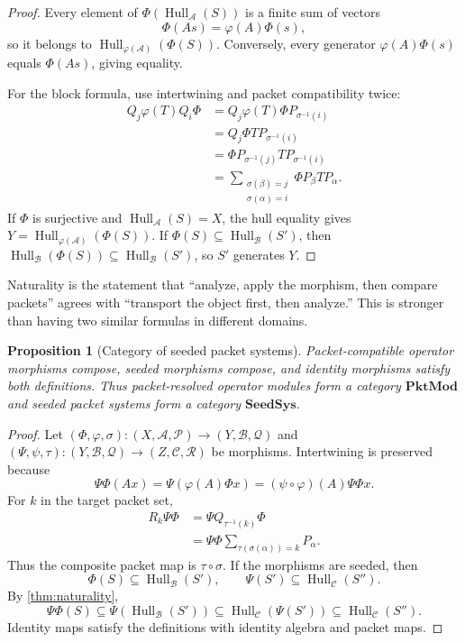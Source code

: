 \documentclass[11pt]{article}
\newtheorem{proposition}[proposition]{Proposition}
\theoremstyle{definition}
\theoremstyle{remark}
\theoremstyle{definition}\newtheorem{example}[theorem]{Example}
\newcommand{\A}{\mathcal A}
\newcommand{\B}{\mathcal B}
\newcommand{\Ccal}{\mathcal C}
\newcommand{\Pcal}{\mathcal P}
\newcommand{\Qcal}{\mathcal Q}
\newcommand{\Rcal}{\mathcal R}
\newcommand{\Hull}{\operatorname{Hull}}
\newcommand{\RecordID}[1]{\label{record:#1}}
\newcommand{\Depends}[1]{}
\begin{document}
\begin{proof}
Every element of $\Phi(\Hull_\A(S))$ is a finite sum of vectors
\[
\Phi(As)=\varphi(A)\Phi(s),
\]
so it belongs to $\Hull_{\varphi(\A)}(\Phi(S))$.  Conversely, every generator $\varphi(A)\Phi(s)$ equals $\Phi(As)$, giving equality.

For the block formula, use intertwining and packet compatibility twice:
\begin{align*}
Q_j\varphi(T)Q_i\Phi
&=Q_j\varphi(T)\Phi P_{\sigma^{-1}(i)}\\
&=Q_j\Phi TP_{\sigma^{-1}(i)}\\
&=\Phi P_{\sigma^{-1}(j)}TP_{\sigma^{-1}(i)}\\
&=\sum_{\substack{\sigma(\beta)=j\\\sigma(\alpha)=i}}
\Phi P_\beta TP_\alpha.
\end{align*}
If $\Phi$ is surjective and $\Hull_\A(S)=X$, the hull equality gives $Y=\Hull_{\varphi(\A)}(\Phi(S))$.  If $\Phi(S)\subseteq\Hull_\B(S')$, then $\Hull_\B(\Phi(S))\subseteq\Hull_\B(S')$, so $S'$ generates $Y$.
\end{proof}

\begin{keyidea}
Naturality is the statement that ``analyze, apply the morphism, then compare packets'' agrees with ``transport the object first, then analyze.''  This is stronger than having two similar formulas in different domains.
\end{keyidea}


\begin{proposition}[Category of seeded packet systems]
\label{prop:seed-category}
Packet-compatible operator morphisms compose, seeded morphisms compose, and identity morphisms satisfy both definitions.  Thus packet-resolved operator modules form a category $\mathbf{PktMod}$ and seeded packet systems form a category $\mathbf{SeedSys}$.
\end{proposition}
\RecordID{PSC-I-P-SEED-SYSTEM-CATEGORY}
\Depends{\nolinkurl{PSC-I-D-PACKET-MORPHISM},
\nolinkurl{PSC-I-D-SEED-MORPHISM}, and
\nolinkurl{PSC-I-T-NATURALITY}.}

\begin{proof}
Let $(\Phi,\varphi,\sigma):(X,\A,\Pcal)\to(Y,\B,\Qcal)$ and $(\Psi,\psi,\tau):(Y,\B,\Qcal)\to(Z,\Ccal,\Rcal)$ be morphisms.  Intertwining is preserved because
\[
\Psi\Phi(Ax)
=
\Psi(\varphi(A)\Phi x)
=
(\psi\circ\varphi)(A)\Psi\Phi x.
\]
For $k$ in the target packet set,
\begin{align*}
R_k\Psi\Phi
&=\Psi Q_{\tau^{-1}(k)}\Phi\\
&=\Psi\Phi
\sum_{\tau(\sigma(\alpha))=k}P_\alpha.
\end{align*}
Thus the composite packet map is $\tau\circ\sigma$.  If the morphisms are seeded, then
\[
\Phi(S)\subseteq\Hull_\B(S'),
\qquad
\Psi(S')\subseteq\Hull_\Ccal(S'').
\]
By \cref{thm:naturality},
\[
\Psi\Phi(S)
\subseteq
\Psi(\Hull_\B(S'))
\subseteq
\Hull_\Ccal(\Psi(S'))
\subseteq
\Hull_\Ccal(S'').
\]
Identity maps satisfy the definitions with identity algebra and packet maps.
\end{proof}
\end{document}

